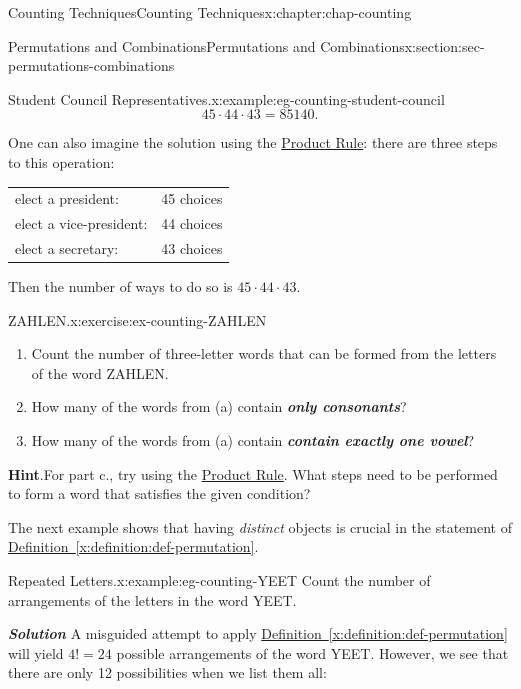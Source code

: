 \documentclass[oneside,10pt,]{book}
\newcommand{\blocktitlefont}{\relax}
\newcommand{\tabularfont}{\relax}
\newcommand{\xreffont}{\relax}
\newcommand{\alert}[1]{\textbf{\textit{#1}}}
\numberwithin{equation}{section}
\begin{document}
\begin{chapterptx}{Counting Techniques}{}{Counting Techniques}{}{}{x:chapter:chap-counting}
\begin{sectionptx}{Permutations and Combinations}{}{Permutations and Combinations}{}{}{x:section:sec-permutations-combinations}
\begin{example}{Student Council Representatives.}{x:example:eg-counting-student-council}
\begin{equation*}
45 \cdot 44 \cdot 43 = 85140\text{.}
\end{equation*}
%
\par
One can also imagine the solution using the \hyperref[x:principle:prin-prod-rule]{Product Rule}: there are three steps to this operation:%
\begin{sidebyside}{1}{0.15}{0.15}{0}%
\begin{sbspanel}{0.7}%
{\centering%
{\tabularfont%
\begin{tabular}{ll}
elect a president:&45 choices\tabularnewline[0pt]
elect a vice-president:&44 choices\tabularnewline[0pt]
elect a secretary:&43 choices
\end{tabular}
}%
\par}
\end{sbspanel}%
\end{sidebyside}%
\par
Then the number of ways to do so is \(45 \cdot 44 \cdot 43\).%
\end{example}
\begin{inlineexercise}{ZAHLEN.}{x:exercise:ex-counting-ZAHLEN}%
%
\begin{enumerate}[label=(\alph*)]
\item{}Count the number of three-letter words that can be formed from the letters of the word ZAHLEN.%
\item{}How many of the words from (a) contain \alert{only consonants}?%
\item{}How many of the words from (a) contain \alert{contain exactly one vowel}?%
\end{enumerate}
%
\par\smallskip%
\noindent\textbf{\blocktitlefont Hint}.\hypertarget{g:hint:id440594}{}\quad{}For part c., try using the \hyperref[x:principle:prin-prod-rule]{Product Rule}. What steps need to be performed to form a word that satisfies the given condition?%
\end{inlineexercise}
The next example shows that having \emph{distinct} objects is crucial in the statement of \hyperref[x:definition:def-permutation]{Definition~{\xreffont\ref{x:definition:def-permutation}}}.%
\begin{example}{Repeated Letters.}{x:example:eg-counting-YEET}%
Count the number of arrangements of the letters in the word YEET.%
\par
\alert{Solution} A misguided attempt to apply \hyperref[x:definition:def-permutation]{Definition~{\xreffont\ref{x:definition:def-permutation}}} will yield \(4! = 24\) possible arrangements of the word YEET. However, we see that there are only 12 possibilities when we list them all:%

\end{example}
\end{sectionptx}
\end{chapterptx}
\end{document}
